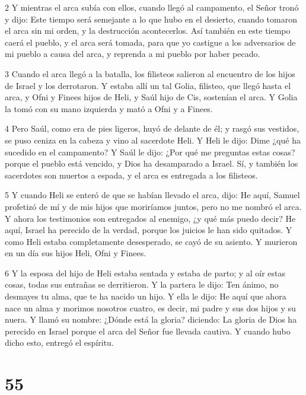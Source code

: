 \par 2 Y mientras el arca subía con ellos, cuando llegó al campamento, el Señor tronó y dijo: Este tiempo será semejante a lo que hubo en el desierto, cuando tomaron el arca sin mi orden, y la destrucción acontecerlos. Así también en este tiempo caerá el pueblo, y el arca será tomada, para que yo castigue a los adversarios de mi pueblo a causa del arca, y reprenda a mi pueblo por haber pecado.

\par 3 Cuando el arca llegó a la batalla, los filisteos salieron al encuentro de los hijos de Israel y los derrotaron. Y estaba allí un tal Golia, filisteo, que llegó hasta el arca, y Ofni y Finees hijos de Heli, y Saúl hijo de Cis, sostenían el arca. Y Golia la tomó con su mano izquierda y mató a Ofni y a Finees.

\par 4 Pero Saúl, como era de pies ligeros, huyó de delante de él; y rasgó sus vestidos, se puso ceniza en la cabeza y vino al sacerdote Heli. Y Heli le dijo: Dime ¿qué ha sucedido en el campamento? Y Saúl le dijo: ¿Por qué me preguntas estas cosas? porque el pueblo está vencido, y Dios ha desamparado a Israel. Sí, y también los sacerdotes son muertos a espada, y el arca es entregada a los filisteos.

\par 5 Y cuando Heli se enteró de que se habían llevado el arca, dijo: He aquí, Samuel profetizó de mí y de mis hijos que moriríamos juntos, pero no me nombró el arca. Y ahora los testimonios son entregados al enemigo, ¿y qué más puedo decir? He aquí, Israel ha perecido de la verdad, porque los juicios le han sido quitados. Y como Heli estaba completamente desesperado, se cayó de su asiento. Y murieron en un día sus hijos Heli, Ofni y Finees.

\par 6 Y la esposa del hijo de Heli estaba sentada y estaba de parto; y al oír estas cosas, todas sus entrañas se derritieron. Y la partera le dijo: Ten ánimo, no desmayes tu alma, que te ha nacido un hijo. Y ella le dijo: He aquí que ahora nace un alma y morimos nosotros cuatro, es decir, mi padre y sus dos hijos y su nuera. Y llamó su nombre: ¿Dónde está la gloria? diciendo: La gloria de Dios ha perecido en Israel porque el arca del Señor fue llevada cautiva. Y cuando hubo dicho esto, entregó el espíritu.

\chapter{55}

